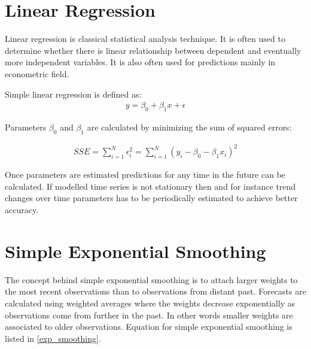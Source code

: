     \section{Linear Regression} \label{sec:linear-regression}
    Linear regression is classical statistical analysis technique. It is often used to
    determine whether there is linear relationship between dependent and eventually more
    independent variables. It is also often used for predictions mainly in econometric
    field. 

    Simple linear regression is defined as:
    \begin{eqnarray}
        y = \beta_0 + \beta_1 x + \epsilon
    \end{eqnarray}

    Parameters $\beta_0$ and $\beta_1$ are calculated by minimizing the sum of squared
    errors:
    
    \begin{eqnarray}
        SSE = \sum_{i=1}^N \epsilon_{i}^2 = \sum_{i=1}^N (y_i - \beta_0 - \beta_1 x_i)^2
    \end{eqnarray}
    
    Once parameters are estimated predictions for any time in the future can be calculated. 
    If modelled time series is not stationary then and for instance trend changes over
    time parameters has to be periodically estimated to achieve better accuracy. 

    \section{Simple Exponential Smoothing}
    The concept behind simple exponential smoothing is to attach 
    larger weights to the most recent observations than to observations from distant
    past. Forecasts are calculated using weighted averages where the weights 
    decrease exponentially as observations come from further in the past.
    In other words smaller weights are associated to older observations.
    Equation for simple exponential smoothing is listed in \ref{exp_smoothing}.

